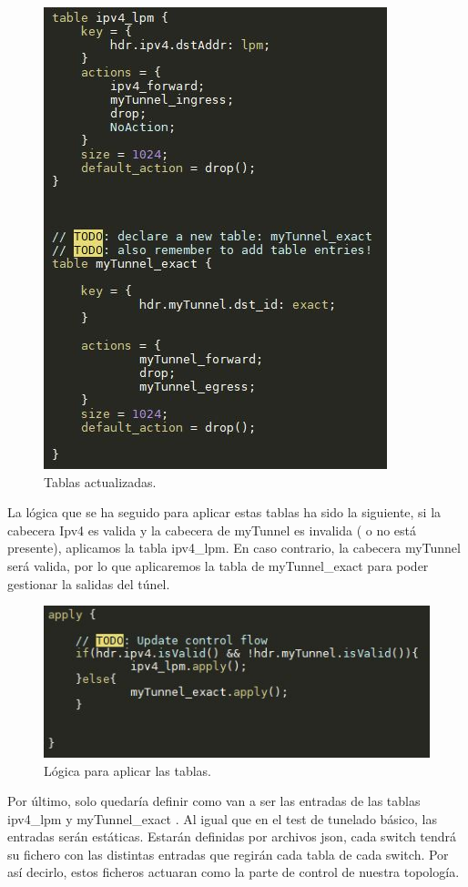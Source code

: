 \begin{figure}[!htb]
  \centering
    \includegraphics[width=0.5\linewidth]{./img/test/14.JPG}
    \caption{Tablas actualizadas.}
  \label{fig:yo}
\end{figure}
La lógica que se ha seguido para aplicar estas tablas ha sido la siguiente, si la cabecera Ipv4 es valida y la cabecera de myTunnel es invalida ( o no está presente), aplicamos la tabla ipv4\_lpm. En caso contrario, la cabecera myTunnel será valida, por lo que aplicaremos la tabla de myTunnel\_exact para poder gestionar la salidas del túnel.\newline
\newline
\begin{figure}[!htb]
  \centering
    \includegraphics[width=0.7\linewidth]{./img/test/15.JPG}
    \caption{Lógica para aplicar las tablas.}
  \label{fig:yo}
\end{figure}
\newpage
Por último, solo quedaría definir como van a ser las entradas de las tablas ipv4\_lpm y myTunnel\_exact . Al igual que en el test de tunelado básico, las entradas serán estáticas. Estarán definidas por archivos json, cada switch tendrá su fichero con las distintas entradas que regirán cada tabla de cada switch. Por así decirlo, estos ficheros actuaran como la parte de control de nuestra topología. \newline

